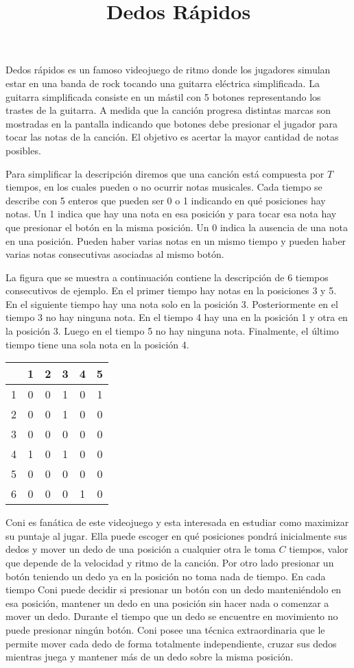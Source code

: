 \documentclass{oci}
\title{Dedos Rápidos}
\begin{document}
\begin{problemDescription}
  Dedos rápidos es un famoso videojuego de ritmo donde los jugadores simulan
  estar en una banda de rock tocando una guitarra eléctrica simplificada.
  La guitarra simplificada consiste en un mástil con 5 botones representando los
  trastes de la guitarra.
  A medida que la canción progresa distintas marcas son mostradas en la pantalla
  indicando que botones debe presionar el jugador para tocar las notas de la canción.
  El objetivo es acertar la mayor cantidad de notas posibles.

  Para simplificar la descripción diremos que una canción está compuesta por $T$
  tiempos, en los cuales pueden o no ocurrir notas musicales.
  Cada tiempo se describe con 5 enteros que pueden ser 0 o 1 indicando en qué
  posiciones hay notas.
  Un 1 indica que hay una nota en esa posición y para tocar esa nota hay que
  presionar el botón en la misma posición.
  Un 0 indica la ausencia de una nota en una posición.
  Pueden haber varias notas en un mismo tiempo y pueden haber varias
  notas consecutivas asociadas al mismo botón.

  La figura que se muestra a continuación contiene la descripción de 6 tiempos
  consecutivos de ejemplo.
  En el primer tiempo hay notas en la posiciones 3 y 5.
  En el siguiente tiempo hay una nota solo en la posición 3.
  Posteriormente en el tiempo 3 no hay ninguna nota.
  En el tiempo 4 hay una en la posición 1 y otra en la posición 3.
  Luego en el tiempo 5 no hay ninguna nota.
  Finalmente, el último tiempo tiene una sola nota en la posición 4.

  \begin{center}
    \begin{tabular}{r|ccccc}
        & 1 & 2 & 3 & 4 & 5 \\
      \hline
      1 & 0 & 0 & 1 & 0 & 1 \\
      2 & 0 & 0 & 1 & 0 & 0 \\
      3 & 0 & 0 & 0 & 0 & 0 \\
      4 & 1 & 0 & 1 & 0 & 0 \\
      5 & 0 & 0 & 0 & 0 & 0 \\
      6 & 0 & 0 & 0 & 1 & 0 \\
    \end{tabular}
  \end{center}

  Coni es fanática de este videojuego y esta interesada en estudiar como
  maximizar su puntaje al jugar.
  Ella puede escoger en qué posiciones pondrá inicialmente sus dedos y mover un
  dedo de una posición a cualquier otra le toma $C$ tiempos, valor que depende
  de la velocidad y ritmo de la canción.
  Por otro lado presionar un botón teniendo un dedo ya en la posición no toma
  nada de tiempo.
  En cada tiempo Coni puede decidir si presionar un botón con un dedo
  manteniéndolo en esa posición, mantener un dedo en una posición sin hacer nada
  o comenzar a mover un dedo.
  Durante el tiempo que un dedo se encuentre en movimiento no puede presionar
  ningún botón.
  Coni posee una técnica extraordinaria que le permite mover cada dedo
  de forma totalmente independiente, cruzar sus dedos mientras juega y mantener
  más de un dedo sobre la misma posición.


\end{problemDescription}
\end{document}
